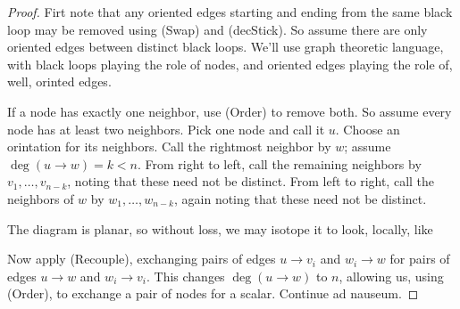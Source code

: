 \begin{proof}
    Firt note that any oriented edges starting and ending from the same black loop may be removed
    using (Swap) and (decStick).
    So assume there are only oriented edges between distinct black loops.
    We'll use graph theoretic language, with black loops playing the role of nodes,
    and oriented edges playing the role of, well, orinted edges.

    If a node has exactly one neighbor, use (Order) to remove both.
    So assume every node has at least two neighbors.
    Pick one node and call it $u$.
    Choose an orintation for its neighbors.
    Call the rightmost neighbor by $w$;
    assume $\deg(u\to w)=k<n$.
    From right to left, call the remaining neighbors by $v_1,\dots,v_{n-k}$, noting that
    these need not be distinct.
    From left to right, call the neighbors of $w$ by $w_1,\dots,w_{n-k}$, again noting that 
    these need not be distinct.

    The diagram is planar, so without loss, we may isotope it to look, locally, like
    \begin{center}
    \end{center}

    Now apply (Recouple), exchanging pairs of edges $u\to v_i$ and $w_i \to w$ for pairs of edges $u\to w$ and $w_i\to v_i$.
    This changes $\deg(u\to w)$ to $n$, allowing us, using (Order), to exchange a pair of nodes for a scalar.
    Continue ad nauseum.
\end{proof}








